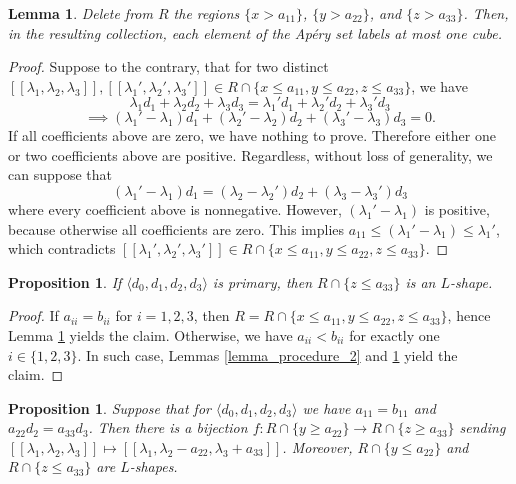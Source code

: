 \documentclass[12pt]{article}
\newtheorem{lemma}[thm]{Lemma}
\newtheorem{prop}[thm]{Proposition}
\theoremstyle{remark}
\begin{document}
\begin{lemma}\label{lemma_procedure_3}
    Delete from $R$ the regions $\{x > a_{11}\}$, $\{y > a_{22}\}$, and $\{z > a_{33}\}$. Then, in the resulting collection, each element of the Ap{\'e}ry set labels at most one cube.
\end{lemma}
\begin{proof}
     Suppose to the contrary, that for two distinct $[[\lambda_1, \lambda_2, \lambda_3]], [[\lambda_1', \lambda_2', \lambda_3']] \in R \cap \{x \leq a_{11}, y \leq a_{22}, z \leq a_{33} \}$, we have
    \begin{equation*}
        \lambda_1d_1 + \lambda_2d_2 + \lambda_3d_3 = \lambda_1'd_1 + \lambda_2'd_2 + \lambda_3'd_3 
    \end{equation*}
    \begin{equation*}
        \implies  (\lambda_1' - \lambda_1)d_1 + (\lambda_2' - \lambda_2)d_2 + (\lambda_3' - \lambda_3)d_3 = 0.
    \end{equation*}
    If all coefficients above are zero, we have nothing to prove. Therefore either one or two coefficients above are positive. Regardless, without loss of generality, we can suppose that
    \begin{equation}\label{propeq3}
         (\lambda_1' - \lambda_1)d_1 = (\lambda_2 - \lambda_2')d_2 + (\lambda_3 - \lambda_3')d_3
    \end{equation}
    where every coefficient above is nonnegative. However, $(\lambda_1' - \lambda_1)$ is positive, because otherwise all coefficients are zero. This implies $a_{11} \leq (\lambda_1' - \lambda_1) \leq \lambda_1'$, which contradicts $[[\lambda_1', \lambda_2', \lambda_3']] \in R \cap \{x \leq a_{11}, y \leq a_{22}, z \leq a_{33} \}$.
\end{proof}

\begin{prop}\label{prop_primary}
    If $\langle d_0,d_1,d_2,d_3 \rangle$ is primary, then $R \cap \{z \leq a_{33}\}$ is an $L$-shape.
\end{prop}
\begin{proof}
    If $a_{ii} = b_{ii}$ for $i = 1,2,3$, then $R = R \cap \{x \leq a_{11}, y \leq a_{22}, z \leq a_{33} \}$, hence Lemma \ref{lemma_procedure_3} yields the claim. Otherwise, we have $a_{ii} < b_{ii}$ for exactly one $i \in \{1,2,3\}$. In such case, Lemmas \ref{lemma_procedure_2} and \ref{lemma_procedure_3} yield the claim.
\end{proof}


\begin{prop}\label{prop_secondary}
    Suppose that for $\langle d_0,d_1,d_2,d_3 \rangle$ we have $a_{11}=b_{11}$ and $a_{22}d_2 = a_{33}d_3$. Then there is a bijection $f : R \cap \{y \geq a_{22}\} \to R \cap \{z \geq a_{33}\}$ sending $[[\lambda_1,\lambda_2,\lambda_3]] \mapsto [[\lambda_1,\lambda_2-a_{22},\lambda_3+a_{33}]]$. Moreover, $R \cap \{y \leq a_{22}\}$ and $R \cap \{z \leq a_{33}\}$ are $L$-shapes.
\end{prop}
\end{document}
